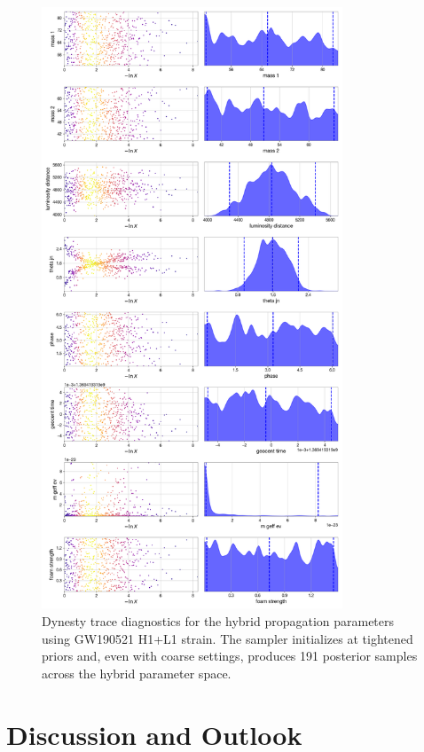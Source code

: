 \documentclass[12pt]{article}
\begin{document}
\begin{figure}[t]
  \centering
  \includegraphics[width=0.8\textwidth]{bilby_stub_GW230529_181500/hybrid_checkpoint_trace.png}
  \caption{Dynesty trace diagnostics for the hybrid propagation parameters using GW190521 H1+L1 strain. The sampler initializes at tightened priors and, even with coarse settings, produces 191 posterior samples across the hybrid parameter space.}
  \label{fig:trace}
\end{figure}

\section{Discussion and Outlook}
\end{document}
